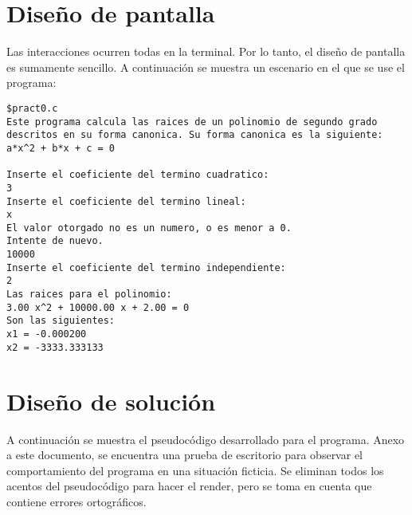 \documentclass[conference]{IEEEtran}
\begin{document}
\section{Diseño de pantalla}
    Las interacciones ocurren todas en la terminal. Por lo tanto, el diseño de pantalla es sumamente sencillo. A continuación se muestra un escenario en el que se use el programa:

\begin{lstlisting}[style=terminal]
$pract0.c
Este programa calcula las raices de un polinomio de segundo grado
descritos en su forma canonica. Su forma canonica es la siguiente:
a*x^2 + b*x + c = 0
    
Inserte el coeficiente del termino cuadratico:
3
Inserte el coeficiente del termino lineal:
x
El valor otorgado no es un numero, o es menor a 0.            
Intente de nuevo.
10000
Inserte el coeficiente del termino independiente:
2
Las raices para el polinomio:
3.00 x^2 + 10000.00 x + 2.00 = 0
Son las siguientes:
x1 = -0.000200
x2 = -3333.333133
\end{lstlisting}

\section{Diseño de solución}
    A continuación se muestra el pseudocódigo desarrollado para el programa. Anexo
    a este documento, se encuentra una prueba de escritorio para observar el
    comportamiento del programa en una situación ficticia. Se eliminan todos los
    acentos del pseudocódigo para hacer el render, pero se toma en cuenta que
    contiene errores ortográficos.
\end{document}
